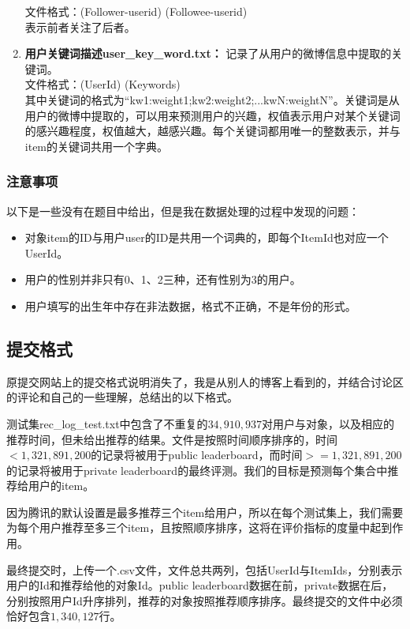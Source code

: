 \documentclass[12pt]{article} %
\begin{document}
\begin{sloppypar}
\begin{enumerate}
	文件格式：(Follower-userid) (Followee-userid) \\
	表示前者关注了后者。
	\item {\bf 用户关键词描述user\_key\_word.txt：} 记录了从用户的微博信息中提取的关键词。\\
	文件格式：(UserId) (Keywords) \\
	其中关键词的格式为“kw1:weight1;kw2:weight2;...kwN:weightN”。关键词是从用户的微博中提取的，可以用来预测用户的兴趣，权值表示用户对某个关键词的感兴趣程度，权值越大，越感兴趣。每个关键词都用唯一的整数表示，并与item的关键词共用一个字典。
\end{enumerate}

\subsubsection{注意事项}

以下是一些没有在题目中给出，但是我在数据处理的过程中发现的问题：
\begin{itemize}
\item 对象item的ID与用户user的ID是共用一个词典的，即每个ItemId也对应一个UserId。
\item 用户的性别并非只有0、1、2三种，还有性别为3的用户。
\item 用户填写的出生年中存在非法数据，格式不正确，不是年份的形式。
\end{itemize}

\subsection{提交格式}
\label{sec:submit}

原提交网站上的提交格式说明消失了，我是从别人的博客上看到的，并结合讨论区的评论和自己的一些理解，总结出的以下格式。

测试集rec\_log\_test.txt中包含了不重复的$34,910,937$对用户与对象，以及相应的推荐时间，但未给出推荐的结果。文件是按照时间顺序排序的，时间$<1,321,891,200$的记录将被用于public leaderboard，而时间$>=1,321,891,200$的记录将被用于private leaderboard的最终评测。我们的目标是预测每个集合中推荐给用户的item。

因为腾讯的默认设置是最多推荐三个item给用户，所以在每个测试集上，我们需要为每个用户推荐至多三个item，且按照顺序排序，这将在评价指标的度量中起到作用。

最终提交时，上传一个.csv文件，文件总共两列，包括UserId与ItemIds，分别表示用户的Id和推荐给他的对象Id。public leaderboard数据在前，private数据在后，分别按照用户Id升序排列，推荐的对象按照推荐顺序排序。最终提交的文件中必须恰好包含$1,340,127$行。


\end{sloppypar}
\end{document}
